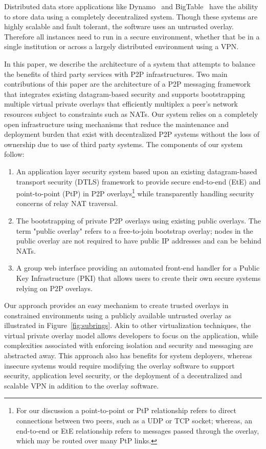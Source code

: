 \documentclass[conference]{IEEEtran}
\begin{document}
Distributed data store applications like Dynamo~\cite{dynamo} and
BigTable~\cite{bigtable} have the ability to store data using a completely
decentralized system.  Though these systems are highly scalable and fault
tolerant, the software uses an untrusted overlay.  Therefore all instances
need to run in a secure environment, whether that be in a single institution
or across a largely distributed environment using a VPN.

In this paper, we describe the architecture of a system that attempts
to balance the benefits of third party services with P2P infrastructures.
Two main contributions of this paper are the architecture of a P2P messaging
framework that integrates existing datagram-based security and supports
bootstrapping multiple virtual private overlays that efficiently multiplex a
peer's network resources subject to constraints such as NATs.
Our system relies on a completely open infrastructure using mechanisms that
reduce the maintenance and deployment burden that exist with decentralized
P2P systems without the loss of ownership due to use of third party systems.
The components of our system follow:
\begin{enumerate}
\setlength{\itemsep}{0pt}
\setlength{\parskip}{0pt}
\item An application layer security system based upon an existing datagram-based
transport security (DTLS) framework to provide secure end-to-end (EtE) and
point-to-point (PtP) in P2P overlays\footnote{For our discussion a point-to-point
or PtP relationship refers to direct connections between two peers, such as a UDP
or TCP socket; whereas, an end-to-end or EtE relationship refers to messages passed
through the overlay, which may be routed over many PtP links.}
 while transparently handling security
concerns of relay NAT traversal.
\item The bootstrapping of private P2P overlays using existing public overlays.
The term "public overlay" refers to a free-to-join bootstrap overlay; nodes in
the public overlay are not required to have public IP addresses and can be
behind NATs.
\item A group web interface providing an automated front-end handler for a 
Public Key Infrastructure (PKI) that allows users to create their own secure
systems relying on P2P overlays.
\end{enumerate}

Our approach provides an easy mechanism to create trusted overlays in
constrained environments using a publicly available untrusted overlay as
illustrated in Figure~\ref{fig:subrings}.  Akin to other virtualization
techniques, the virtual private overlay model allows developers to focus
on the application, while complexities associated with enforcing isolation
and security and messaging are abstracted away.
This approach also has benefits for system deployers, whereas insecure systems
would require modifying the overlay software to support security, application
level security, or the deployment of a decentralized and scalable VPN in
addition to the overlay software.
\end{document}
